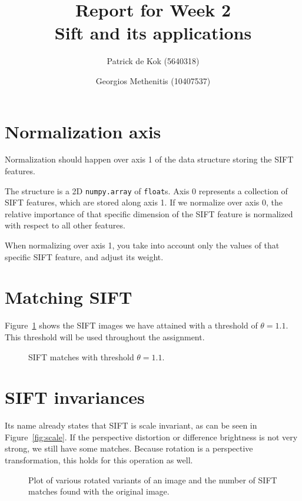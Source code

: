 \documentclass[a4paper,10pt,twoside]{article}
\title{Report for Week 2\\\normalsize Sift and its applications}
\author{Patrick de Kok (5640318) \and Georgios Methenitis (10407537)}
\begin{document}
\maketitle
\thispagestyle{empty}
\newpage

\section{Normalization axis}
Normalization should happen over axis 1 of the data structure storing the SIFT features.  

The structure is a 2D \texttt{numpy.array} of \texttt{float}s.  Axis 0 represents a collection of SIFT features, which are stored along axis 1.  If we normalize over axis 0, the relative importance of that specific dimension of the SIFT feature is normalized with respect to all other features.  

When normalizing over axis 1, you take into account only the values of that specific SIFT feature, and adjust its weight.

\section{Matching SIFT}
Figure~\ref{fig:match} shows the SIFT images we have attained with a threshold of $\theta = 1.1$.  This threshold will be used throughout the assignment.
\begin{figure}
  \begin{center}
  \end{center}
  \label{fig:match}
  \caption{SIFT matches with threshold $\theta = 1.1$.}
\end{figure}

\section{SIFT invariances}
Its name already states that SIFT is scale invariant, as can be seen in Figure~\ref{fig:scale}.  If the perspective distortion or difference brightness is not very strong, we still have some matches.  Because rotation is a perspective transformation, this holds for this operation as well.

\begin{figure}
  \begin{center}
  \end{center}
  \caption{Plot of various rotated variants of an image and the number of SIFT matches found with the original image.}
  \label{fig:rotation}
\end{figure}
\end{document}
